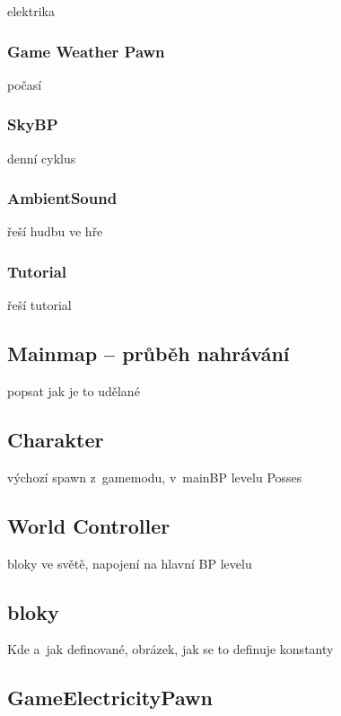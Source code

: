 elektrika

\subsubsection{Game Weather Pawn}

počasí

\subsubsection{SkyBP}

denní cyklus

\subsubsection{AmbientSound}

řeší hudbu ve hře

\subsubsection{Tutorial}

řeší tutorial



\subsection{Mainmap -- průběh nahrávání}

popsat jak je to udělané

\subsection{Charakter}

výchozí spawn z~gamemodu, v~mainBP levelu Posses

\subsection{World Controller}

bloky ve světě, napojení na hlavní BP levelu


\subsection{bloky}

Kde a~jak definované, obrázek, jak se to definuje konstanty


\subsection{GameElectricityPawn}

